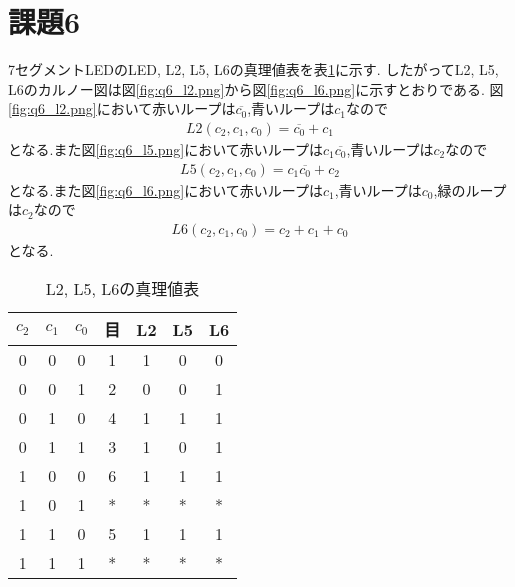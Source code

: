 \section{課題6}
7セグメントLEDのLED, L2, L5, L6の真理値表を表\ref{tab:q6}に示す.
したがってL2, L5, L6のカルノー図は図\ref{fig:q6_l2.png}から図\ref{fig:q6_l6.png}に示すとおりである.
図\ref{fig:q6_l2.png}において赤いループは$\overline{c_0}$,青いループは$c_1$なので
\begin{align*}
  L2(c_2, c_1, c_0)=\overline{c_0}+c_1
\end{align*}
となる.また図\ref{fig:q6_l5.png}において赤いループは$c_1\overline{c_0}$,青いループは$c_2$なので
\begin{align*}
  L5(c_2, c_1, c_0)=c_1\overline{c_0}+c_2
\end{align*}
となる.また図\ref{fig:q6_l6.png}において赤いループは$c_1$,青いループは$c_0$,緑のループは$c_2$なので
\begin{align*}
  L6(c_2, c_1, c_0)=c_2+c_1+c_0
\end{align*}
となる.
\begin{table}[h]
\caption{L2, L5, L6の真理値表}
\label{tab:q6}
\centering
\begin{tabular}{ccccccc}
\hline
$c_2$&$c_1$&$c_0$&目&L2&L5&L6\\
\hline \hline
0 & 0 & 0 & 1 & 1 & 0 & 0 \\
0 & 0 & 1 & 2 & 0 & 0 & 1 \\
0 & 1 & 0 & 4 & 1 & 1 & 1 \\
0 & 1 & 1 & 3 & 1 & 0 & 1 \\
1 & 0 & 0 & 6 & 1 & 1 & 1 \\
1 & 0 & 1 & * & * & * & * \\
1 & 1 & 0 & 5 & 1 & 1 & 1 \\
1 & 1 & 1 & * & * & * & * \\
\hline
\end{tabular}
\end{table}
\newpage
{}
